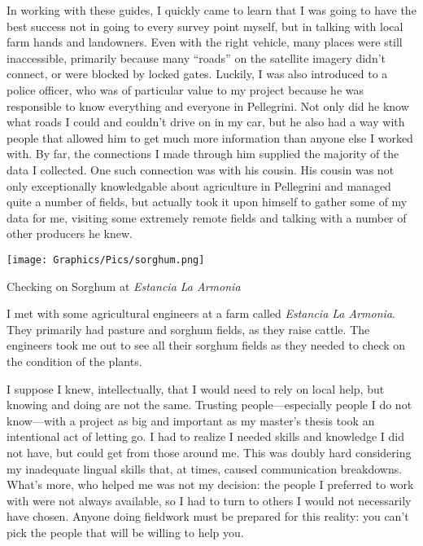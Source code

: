 In working with these guides, I quickly came to learn that I was going to have the best success not in going to every survey point myself, but in talking with local farm hands and landowners. Even with the right vehicle, many places were still inaccessible, primarily because many ``roads'' on the satellite imagery didn’t connect, or were blocked by locked gates. Luckily, I was also introduced to a police officer, who was of particular value to my project because he was responsible to know everything and everyone in Pellegrini. Not only did he know what roads I could and couldn’t drive on in my car, but he also had a way with people that allowed him to get much more information than anyone else I worked with. By far, the connections I made through him supplied the majority of the data I collected. One such connection was with his cousin. His cousin was not only exceptionally knowledgable about agriculture in Pellegrini and managed quite a number of fields, but actually took it upon himself to gather some of my data for me, visiting some extremely remote fields and talking with a number of other producers he knew.

\begin{ssfigure}
  \centering
  \texttt{[image: Graphics/Pics/sorghum.png]}
  \caption{Checking on Sorghum at \textit{Estancia La Armonia}}
  \label{pic:sorghum}
  \medskip
  \small
  I met with some agricultural engineers at a farm called \textit{Estancia La Armonia}. They primarily had pasture and sorghum fields, as they raise cattle. The engineers took me out to see all their sorghum fields as they needed to check on the condition of the plants.
\end{ssfigure}

I suppose I knew, intellectually, that I would need to rely on local help, but knowing and doing are not the same. Trusting people---especially people I do not know---with a project as big and important as my master’s thesis took an intentional act of letting go. I had to realize I needed skills and knowledge I did not have, but could get from those around me. This was doubly hard considering my inadequate lingual skills that, at times, caused communication breakdowns. What’s more, who helped me was not my decision: the people I preferred to work with were not always available, so I had to turn to others I would not necessarily have chosen. Anyone doing fieldwork must be prepared for this reality: you can’t pick the people that will be willing to help you.


